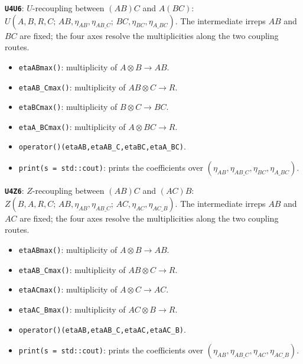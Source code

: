 \documentclass[aps,onecolumn,10pt,superscriptaddress,floatfix,nofootinbib]{revtex4}
\begin{document}
\textbf{\texttt{U4U6}}: $U$-recoupling between $(AB)C$ and $A(BC)$:
$
 U\!\left(A,B,R,C;\,AB,\eta_{AB},\eta_{AB\_C};\,
 BC,\eta_{BC},\eta_{A\_BC}\right).
$
The intermediate irreps $AB$ and $BC$ are fixed; the four axes resolve the
multiplicities along the two coupling routes.
\begin{itemize}
    \item \verb|etaABmax()|: multiplicity of $A\otimes B\to AB$.
    \item \verb|etaAB_Cmax()|: multiplicity of $AB\otimes C\to R$.
    \item \verb|etaBCmax()|: multiplicity of $B\otimes C\to BC$.
    \item \verb|etaA_BCmax()|: multiplicity of $A\otimes BC\to R$.
    \item \verb|operator()(etaAB,etaAB_C,etaBC,etaA_BC)|.
    \item \verb|print(s = std::cout)|: prints the coefficients over
    $(\eta_{AB},\eta_{AB\_C},\eta_{BC},\eta_{A\_BC})$.
\end{itemize}

\textbf{\texttt{U4Z6}}: $Z$-recoupling between $(AB)C$ and $(AC)B$:
$
 Z\!\left(B,A,R,C;\,AB,\eta_{AB},\eta_{AB\_C};\,
 AC,\eta_{AC},\eta_{AC\_B}\right).
$
The intermediate irreps $AB$ and $AC$ are fixed; the four axes resolve the
multiplicities along the two coupling routes.
\begin{itemize}
    \item \verb|etaABmax()|: multiplicity of $A\otimes B\to AB$.
    \item \verb|etaAB_Cmax()|: multiplicity of $AB\otimes C\to R$.
    \item \verb|etaACmax()|: multiplicity of $A\otimes C\to AC$.
    \item \verb|etaAC_Bmax()|: multiplicity of $AC\otimes B\to R$.
    \item \verb|operator()(etaAB,etaAB_C,etaAC,etaAC_B)|.
    \item \verb|print(s = std::cout)|: prints the coefficients over
    $(\eta_{AB},\eta_{AB\_C},\eta_{AC},\eta_{AC\_B})$.
\end{itemize}
\end{document}
